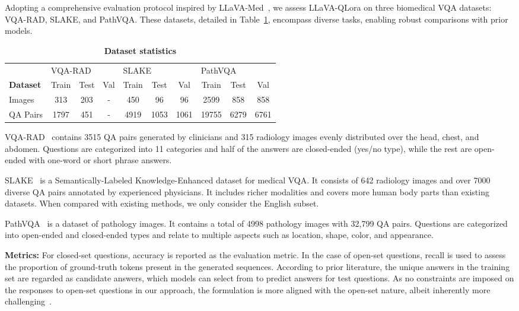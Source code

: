 \documentclass[10pt,letterpaper]{article}
\begin{document}
Adopting a comprehensive evaluation protocol inspired by LLaVA-Med~\cite{li2023llavamed}, we assess LLaVA-QLora on three biomedical VQA datasets: VQA-RAD, SLAKE, and PathVQA. These datasets, detailed in Table~\ref{tab:dataset_statistics}, encompass diverse tasks, enabling robust comparisons with prior models.

\begin{table}[h]
\caption{\bf Dataset statistics}\label{tab3}
\begin{tabular}{@{\extracolsep\fill}l|c|c|c|c|c|c|c|c|c}
\toprule
& \multicolumn{3}{|l|}{VQA-RAD} & \multicolumn{3}{|l|}{SLAKE} & \multicolumn{3}{|l}{PathVQA} \\\cmidrule{2-4}\cmidrule{5-7}\cmidrule{8-10}%
\textbf{Dataset} & Train & Test & Val & Train & Test & Val & Train & Test & Val \\
\midrule
Images & 313 & 203 & - & 450 & 96 & 96 & 2599 & 858 & 858 \\ \hline
QA Pairs & 1797 & 451 & - & 4919 & 1053 & 1061 & 19755 & 6279 & 6761 \\ \hline

\end{tabular}
\label{tab:dataset_statistics}
\end{table}

VQA-RAD~\cite{lau2018dataset} contains 3515 QA pairs generated by clinicians and 315 radiology images evenly distributed over the head, chest, and abdomen. Questions are categorized into 11 categories and half of the answers are closed-ended (yes/no type), while the rest are open-ended with one-word or short phrase answers.

SLAKE~\cite{liu2021slake} is a Semantically-Labeled Knowledge-Enhanced dataset for medical VQA. It consists of 642 radiology images and over 7000 diverse QA pairs annotated by experienced physicians. It includes richer modalities and covers more human body parts than existing datasets. When compared with existing methods, we only consider the English subset.

PathVQA~\cite{he2020pathvqa} is a dataset of pathology images. It contains a total of 4998 pathology images with 32,799 QA pairs. Questions are categorized into open-ended and closed-ended types and relate to multiple aspects such as location, shape, color, and appearance.

\textbf{Metrics:} For closed-set questions, accuracy is reported as the evaluation metric. In the case of open-set questions, recall is used to assess the proportion of ground-truth tokens present in the generated sequences. According to prior literature, the unique answers in the training set are regarded as candidate answers, which models can select from to predict answers for test questions. As no constraints are imposed on the responses to open-set questions in our approach, the formulation is more aligned with the open-set nature, albeit inherently more challenging~\cite{li2023llavamed}.
\end{document}
